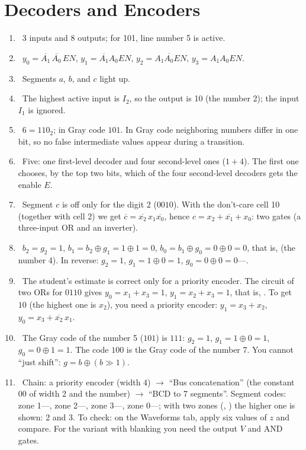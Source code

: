 \section*{Decoders and Encoders}
\begin{enumerate}
  \item {}~3 inputs and 8 outputs; for 101, line number 5 is active.
  \item {}~$y_0=\overline{A_1}\,\overline{A_0}\,EN$, $y_1=\overline{A_1}A_0 EN$, $y_2=A_1\overline{A_0}EN$, $y_3=A_1A_0EN$.
  \item {}~Segments $a$, $b$, and $c$ light up.
  \item {}~The highest active input is $I_2$, so the output is 10 (the number 2); the input $I_1$ is ignored.
  \item {}~$6=110_2$; in Gray code $101$. In Gray code neighboring numbers differ in one bit, so no false intermediate values appear during a transition.
  \item {}~Five: one first-level decoder and four second-level ones ($1+4$). The first one chooses, by the top two bits, which of the four second-level decoders gets the enable $E$.
  \item {}~Segment $c$ is off only for the digit 2 ($0010$). With the don't-care cell 10 (together with cell 2) we get $\overline{c}=\overline{x_2}\,x_1\overline{x_0}$, hence $c=x_2+\overline{x_1}+x_0$: two gates (a three-input OR and an inverter).
  \item {}~$b_2=g_2=1$, $b_1=b_2\oplus g_1=1\oplus1=0$, $b_0=b_1\oplus g_0=0\oplus0=0$, that is,  (the number 4). In reverse: $g_2=1$, $g_1=1\oplus0=1$, $g_0=0\oplus0=0$---.
  \item {}~The student's estimate is correct only for a priority encoder. The circuit of two ORs for $0110$ gives $y_0=x_1+x_3=1$, $y_1=x_2+x_3=1$, that is, . To get $10$ (the highest one is $x_2$), you need a priority encoder: $y_1=x_3+x_2$, $y_0=x_3+\overline{x_2}\,x_1$.
  \item {}~The Gray code of the number 5 ($101$) is $111$: $g_2=1$, $g_1=1\oplus0=1$, $g_0=0\oplus1=1$. The code $100$ is the Gray code of the number 7. You cannot ``just shift'': $g=b\oplus(b\gg1)$.
  \item {}~Chain: a priority encoder (width 4) $\to$ ``Bus concatenation'' (the constant $00$ of width 2 and the number) $\to$ ``BCD to 7 segments''. Segment codes: zone 1---, zone 2---, zone 3---, zone 0---; with two zones (, ) the higher one is shown: 2 and 3. To check: on the Waveforms tab, apply six values of $z$ and compare. For the variant with blanking you need the output $V$ and AND gates.

\end{enumerate}
